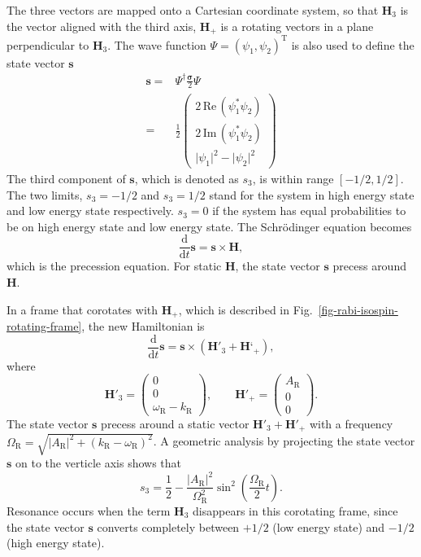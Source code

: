 \documentclass[%
reprint,
 amsmath,amssymb,
 prd,
]{revtex4-1}
\begin{document}
The three vectors are mapped onto a Cartesian coordinate system, so that $\mathbf{H}_3$ is the vector aligned with the third axis, $\mathbf{H}_+$ is a rotating vectors in a plane perpendicular to $\mathbf{H}_3$. The wave function $\Psi=(\psi_1,\psi_2)^{\mathrm{T}}$ is also used to define the state vector $\mathbf{s}$
\begin{align}
    \mathbf{s} =& \Psi^\dagger \frac{\boldsymbol{\sigma}}{2}\Psi \\
    =& \frac{1}{2}\begin{pmatrix}
    2\,\mathrm{Re}\,(\psi_1^* \psi_2) \\
    2\,\mathrm{Im}\,(\psi_1^*\psi_2) \\
    \lvert \psi_1 \rvert^2 - \lvert \psi_2 \rvert^2
    \end{pmatrix}
\end{align}
The third component of $\mathbf{s}$, which is denoted as $s_3$, is within range $[-1/2,1/2]$. The two limits, $s_3=-1/2$ and $s_3=1/2$ stand for the system in high energy state and low energy state respectively. $s_3=0$ if the system has equal probabilities to be on high energy state and low energy state. The Schr\"odinger equation becomes
\begin{equation}
\frac{\mathrm{d}}{\mathrm{d} t } \mathbf{s} = \mathbf{s} \times \mathbf{H},
\end{equation}
which is the precession equation. For static $\mathbf{H}$, the state vector $\mathbf{s}$ precess around $\mathbf{H}$. 

In a frame that corotates with $\mathbf{H}_+$, which is described in Fig.~\ref{fig-rabi-isospin-rotating-frame}, the new Hamiltonian is
\begin{equation}
\frac{\mathrm d}{\mathrm d t } \mathbf{s} = \mathbf{s} \times (\mathbf{H}'_3 + \mathbf{H}‘_+),
\end{equation}
where
\begin{equation}
\mathbf{H}'_3 = \begin{pmatrix}
    0 \\ 0 \\ 　\omega_{\mathrm{R}} - k_{\mathrm R}
    \end{pmatrix}, \qquad \mathbf{H}'_+ = \begin{pmatrix}
    A_{\mathrm{R}} \\ 0 \\ 　0
    \end{pmatrix}.
\end{equation}
The state vector $\mathbf{s}$ precess around a static vector $\mathbf{H}'_3 + \mathbf{H}'_+$ with a frequency $\Omega_{\mathrm R} = \sqrt{ \lvert A_{\mathrm{R}}\rvert^2 + (k_{\mathrm{R}} - \omega_{\mathrm R})^2 }$. A geometric analysis by projecting the state vector $\mathbf{s}$ on to the verticle axis shows that
\begin{equation}
s_3 = \frac{1}{2} - \frac{\lvert A_{\mathrm R}\rvert ^2}{\Omega_{\mathrm R}^2}\sin^2\left(\frac{\Omega_{\mathrm R}}{2} t\right).
\end{equation}
Resonance occurs when the term $\mathbf{H}_3$ disappears in this corotating frame, since the state vector $\mathbf{s}$ converts completely between $+1/2$ (low energy state) and $-1/2$ (high energy state).
\end{document}
